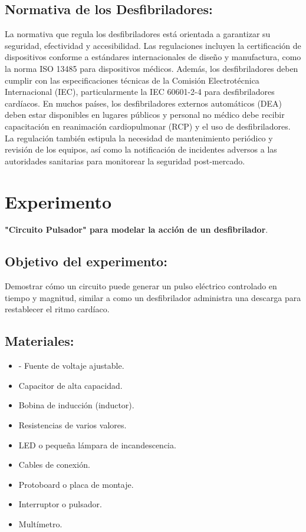 \subsection{Normativa de los Desfibriladores:}

La normativa que regula los desfibriladores está orientada a garantizar su seguridad, efectividad y accesibilidad. Las regulaciones incluyen la certificación de dispositivos conforme a estándares internacionales de diseño y manufactura, como la norma ISO 13485 para dispositivos médicos. Además, los desfibriladores deben cumplir con las especificaciones técnicas de la Comisión Electrotécnica Internacional (IEC), particularmente la IEC 60601-2-4 para desfibriladores cardíacos. En muchos países, los desfibriladores externos automáticos (DEA) deben estar disponibles en lugares públicos y personal no médico debe recibir capacitación en reanimación cardiopulmonar (RCP) y el uso de desfibriladores. La regulación también estipula la necesidad de mantenimiento periódico y revisión de los equipos, así como la notificación de incidentes adversos a las autoridades sanitarias para monitorear la seguridad post-mercado.

\newpage
\section{Experimento}

\textbf{"Circuito Pulsador" para modelar la acción de un desfibrilador}.
\subsection{Objetivo del experimento:}
Demostrar cómo un circuito puede generar un pulso eléctrico controlado en tiempo y magnitud, similar a como un desfibrilador administra una descarga para restablecer el ritmo cardíaco.
\subsection{Materiales:}
\begin{itemize}
    \item - Fuente de voltaje ajustable.
    \item Capacitor de alta capacidad.
    \item Bobina de inducción (inductor).
    \item Resistencias de varios valores.
    \item LED o pequeña lámpara de incandescencia.
    \item Cables de conexión.
    \item Protoboard o placa de montaje.
    \item Interruptor o pulsador.
    \item Multímetro.
\end{itemize}


